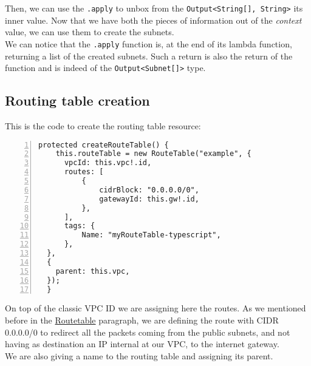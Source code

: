 Then, we can use the \texttt{.apply} to unbox from the \texttt{Output<String[], String>} its inner value.
Now that we have both the pieces of information out of the \textit{context} value, we can use them to create the subnets.\\
We can notice that the \texttt{.apply} function is, at the end of its lambda function, returning a list of the created subnets.
Such a return is also the return of the function and is indeed of the \texttt{Output<Subnet[]>} type.

\subsection{Routing table creation}
This is the code to create the routing table resource:\\
\begin{minipage}{\linewidth}
\begin{lstlisting}[numbers=left, numberstyle=\tiny, numbersep=-5pt, stepnumber=1]
  protected createRouteTable() {
    this.routeTable = new RouteTable("example", {
      vpcId: this.vpc!.id,
      routes: [
          {
              cidrBlock: "0.0.0.0/0",
              gatewayId: this.gw!.id,
          },
      ],
      tags: {
          Name: "myRouteTable-typescript",
      },
  },
  {
    parent: this.vpc,
  });
  }
\end{lstlisting}
\end{minipage}
On top of the classic VPC ID we are assigning here the routes.
As we mentioned before in the \hyperref[sssec:routetable]{Routetable} paragraph, we are defining the route with CIDR 0.0.0.0/0 to redirect all the packets coming from the public subnets, and not having as destination an IP internal at our VPC, to the internet gateway.\\
We are also giving a name to the routing table and assigning its parent.


